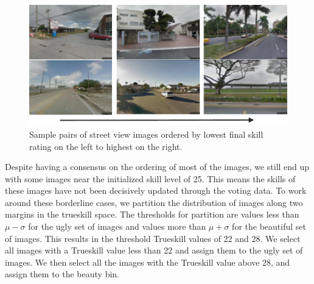 \begin{figure}[t!]
    \centering
    \includegraphics[width=\columnwidth]{SkillSorting.pdf}
    \caption{Sample pairs of street view images ordered by lowest final skill rating on the left to highest on the right. }
    \label{fig:trueskill_example}
\end{figure}
Despite having a consensus on the ordering of most of the images, we still end up with some images near the initialized skill level of 25. This means the skills of these images have not been decisively updated through the voting data. To work around these borderline cases, we partition the distribution of images along two margins in the trueskill space. The thresholds for partition are values less than $\mu - \sigma$ for the ugly set of images and values more than $\mu + \sigma$ for the beautiful set of images. This results in the threshold Trueskill values of 22 and 28.
We select all images with a Trueskill value less than 22 and assign them to the ugly set of images. We then select all the images with the Trueskill value above 28, and assign them to the beauty bin.


